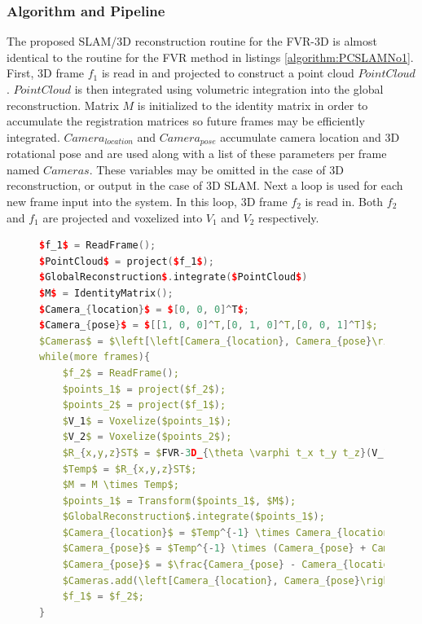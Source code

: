\subsubsection{Algorithm and Pipeline}

\label{METHOD_SECLL}

The proposed SLAM/3D reconstruction routine for the FVR-3D is almost identical to the routine for the FVR method in listings \ref{algorithm:PCSLAMNo1}. First, 3D frame $f_1$ is read in and projected to construct a point cloud $PointCloud$. $PointCloud$ is then integrated using volumetric integration into the global reconstruction. Matrix $M$ is initialized to the identity matrix in order to accumulate the registration matrices so future frames may be efficiently integrated. $Camera_{location}$ and $Camera_{pose}$ accumulate camera location and 3D rotational pose and are used along with a list of these parameters per frame named $Cameras$. These variables may be omitted in the case of 3D reconstruction, or output in the case of 3D SLAM. Next a loop is used for each new frame input into the system. In this loop, 3D frame $f_2$ is read in. Both $f_2$ and $f_1$ are projected and voxelized into $V_1$ and $V_2$ respectively. \\

\begin{figure}
\begin{lstlisting}[language=c++,caption=Phase Correlation Based SLAM Algorithm,label=algorithm:FVR3DSLAM,mathescape,basicstyle=\ttfamily]
$f_1$ = ReadFrame();
$PointCloud$ = project($f_1$);
$GlobalReconstruction$.integrate($PointCloud$)
$M$ = IdentityMatrix();
$Camera_{location}$ = $[0, 0, 0]^T$;
$Camera_{pose}$ = $[[1, 0, 0]^T,[0, 1, 0]^T,[0, 0, 1]^T]$;
$Cameras$ = $\left[\left[Camera_{location}, Camera_{pose}\right] \right]$;
while(more frames){
	$f_2$ = ReadFrame();
	$points_1$ = project($f_2$);
	$points_2$ = project($f_1$);
	$V_1$ = Voxelize($points_1$);
	$V_2$ = Voxelize($points_2$);
	$R_{x,y,z}ST$ = $FVR-3D_{\theta \varphi t_x t_y t_z}(V_1, V_2)$;
	$Temp$ = $R_{x,y,z}ST$;
	$M = M \times Temp$;
	$points_1$ = Transform($points_1$, $M$);
	$GlobalReconstruction$.integrate($points_1$);
	$Camera_{location}$ = $Temp^{-1} \times Camera_{location}$;
	$Camera_{pose}$ = $Temp^{-1} \times (Camera_{pose} + Camera_{location})$;
	$Camera_{pose}$ = $\frac{Camera_{pose} - Camera_{location}}{Camera_{pose} - Camera_{location}}$;
	$Cameras.add(\left[Camera_{location}, Camera_{pose}\right])$;
	$f_1$ = $f_2$;
}
\end{lstlisting}
\end{figure}

